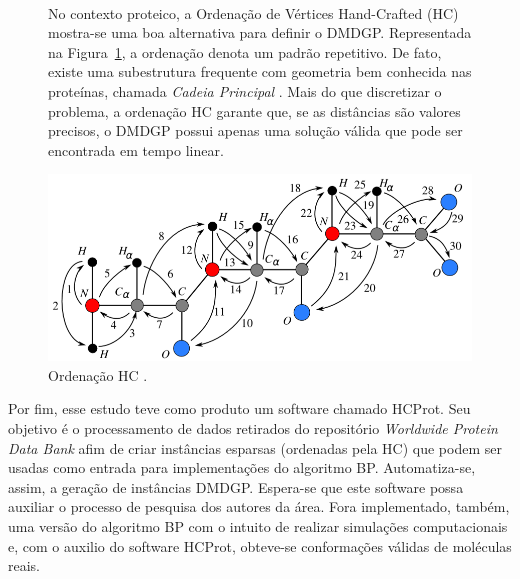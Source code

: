 \documentclass[a4,11pt]{pssbmac}
\begin{document}
	\vspace{-0.25cm}
	\begin{figure}[h!]
		\centering
		\begin{minipage}{0.43\linewidth}   
			\paragraph{} No contexto proteico, a Ordenação de Vértices Hand-Crafted (HC) \cite{carlile:MinimalOrder} mostra-se uma boa alternativa para definir o DMDGP. Representada na Figura~\ref{fig:hcVO}, a ordenação denota um padrão repetitivo. De fato, existe uma subestrutura frequente com geometria bem conhecida nas proteínas, chamada \textit{Cadeia Principal} \cite{bioquimicaLehninger}. Mais do que discretizar o problema, a ordenação HC garante que, se as distâncias são valores precisos, o DMDGP possui apenas uma solução válida que pode ser encontrada em tempo linear.
		\end{minipage}
		\begin{minipage}{0.563\linewidth}
			\includegraphics[scale=0.585]{hcVO.png}
			\caption{Ordenação HC \cite{carlile:MinimalOrder}.}
			\label{fig:hcVO}
		\end{minipage}
	\end{figure}
	\vspace{-0.25cm}
	
	Por fim, esse estudo teve como produto um software chamado HCProt. Seu objetivo é o processamento de dados retirados do repositório \textit{Worldwide Protein Data Bank} afim de criar instâncias esparsas (ordenadas pela HC) que podem ser usadas como entrada para implementações do algoritmo BP.  Automatiza-se, assim, a geração de instâncias DMDGP. Espera-se que este software possa auxiliar o processo de pesquisa dos autores da área. Fora implementado, também,  uma versão do algoritmo BP com o intuito de realizar simulações computacionais e, com o auxilio do software HCProt, obteve-se conformações válidas de moléculas reais. %
	
\end{document}
